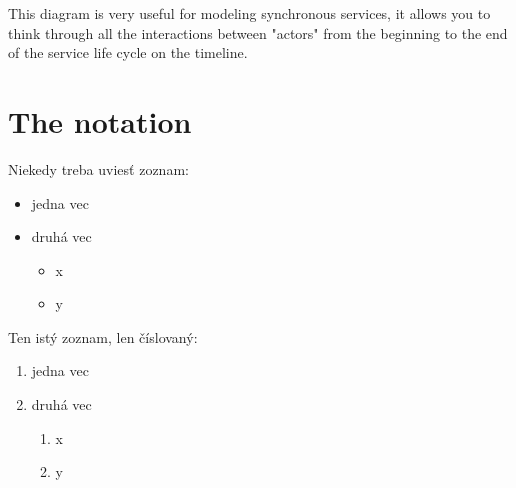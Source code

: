 \documentclass[10pt,twoside,slovak,a4paper]{article}
\begin{document}
This diagram is very useful for modeling synchronous services, it allows you to think through all the interactions between "actors" from the beginning to the end of the service life cycle on the timeline.

\begin{figure*}[tbh]
\centering
\end{figure*}



\section{The notation} \label{notation}





Niekedy treba uviesť zoznam:

\begin{itemize}
\item jedna vec
\item druhá vec
	\begin{itemize}
	\item x
	\item y
	\end{itemize}
\end{itemize}

Ten istý zoznam, len číslovaný:

\begin{enumerate}
\item jedna vec
\item druhá vec
	\begin{enumerate}
	\item x
	\item y
	\end{enumerate}
\end{enumerate}
\end{document}
